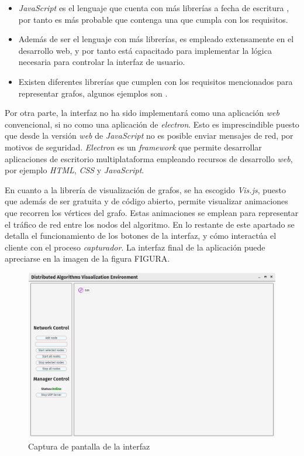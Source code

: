 \begin{itemize}
\item \textit{JavaScript}\cite{js} es el lenguaje que cuenta con más librerías a fecha de escritura \cite{libraries}, por tanto es más probable que contenga una que cumpla con los requisitos.

\item Además de ser el lenguaje con más librerías, es empleado extensamente en el desarrollo web, y por tanto está capacitado para implementar la lógica necesaria para controlar la interfaz de usuario.

\item Existen diferentes librerías que cumplen con los requisitos mencionados para representar grafos, algunos ejemplos son \cite{visjs}\cite{gojs}\cite{10.1093/bioinformatics/btv557}.
\end{itemize}

Por otra parte, la interfaz no ha sido implementará como una aplicación \textit{web} convencional, si no como una aplicación de \textit{electron}. Esto es imprescindible puesto que desde la versión \textit{web} de \textit{JavaScript} no es posible enviar mensajes de red, por motivos de seguridad. \textit{Electron}\cite{electron} es un \textit{framework} que permite desarrollar aplicaciones de escritorio multiplataforma empleando recursos de desarrollo \textit{web}, por ejemplo \textit{HTML}, \textit{CSS} y \textit{JavaScript}.

En cuanto a la librería de visualización de grafos, se ha escogido \textit{Vis.js}\cite{visjs}, puesto que además de ser gratuita y de código abierto, permite visualizar animaciones que recorren los vértices del grafo. Estas animaciones se emplean para representar el tráfico de red entre los nodos del algoritmo. En lo restante de este apartado se detalla el funcionamiento de los botones de la interfaz, y cómo interactúa el cliente con el proceso \textit{capturador}. La interfaz final de la aplicación puede apreciarse en la imagen de la figura FIGURA.

\begin{figure}[h]
  \centering
  \includegraphics[width=0.9\linewidth]{imagenes/dave1}
  \caption{Captura de pantalla de la interfaz}
  \label{fig:dave1}
\end{figure}

